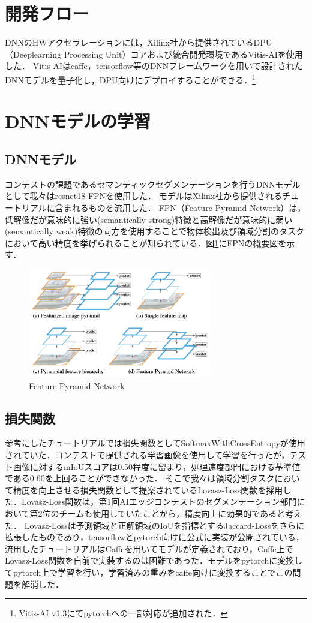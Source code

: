 \section{開発フロー}
DNNのHWアクセラレーションには，Xilinx社から提供されているDPU（Deeplearning Processing Unit）コア\cite{dpuip}および統合開発環境であるVitis-AIを使用した．
Vitis-AIはcaffe，tensorflow等のDNNフレームワークを用いて設計されたDNNモデルを量子化し，DPU向けにデプロイすることができる．\footnote{Vitis-AI v1.3にてpytorchへの一部対応が追加された．}
\section{DNNモデルの学習}
\subsection{DNNモデル}
コンテストの課題であるセマンティックセグメンテーションを行うDNNモデルとして我々はresnet18-FPNを使用した．
モデルはXilinx社から提供されるチュートリアル\cite{tutorial}に含まれるものを流用した．
FPN（Feature Pyramid Network）\cite{fpn}は，低解像だが意味的に強い(semantically strong)特徴と高解像だが意味的に弱い(semantically weak)特徴の両方を使用することで物体検出及び領域分割のタスクにおいて高い精度を挙げられることが知られている．図\ref{figure_fpn}にFPNの概要図を示す．
\begin{figure}[t]
    \begin{center}
        \includegraphics[width=8.0cm]{figures/fpn.png}
        \caption{Feature Pyramid Network\cite{fpn}}
        \label{figure_fpn}
        \end{center}
\end{figure}
\subsection{損失関数}
参考にしたチュートリアルでは損失関数としてSoftmaxWithCrossEntropyが使用されていた．コンテストで提供される学習画像を使用して学習を行ったが，テスト画像に対するmIoUスコアは0.50程度に留まり，処理速度部門における基準値である0.60を上回ることができなかった．
そこで我々は領域分割タスクにおいて精度を向上させる損失関数として提案されているLovasz-Loss関数\cite{lovasz}を採用した．Lovasz-Loss関数は，第1回AIエッジコンテストのセグメンテーション部門において第2位のチームも使用していたことから\cite{ref_signate_report}，精度向上に効果的であると考えた．
Lovasz-Lossは予測領域と正解領域のIoUを指標とするJaccard-Lossをさらに拡張したものであり，tensorflowとpytorch向けに公式に実装が公開されている．流用したチュートリアルはCaffeを用いてモデルが定義されており，Caffe上でLovasz-Loss関数を自前で実装するのは困難であった．モデルをpytorchに変換してpytorch上で学習を行い，学習済みの重みをcaffe向けに変換することでこの問題を解消した．
